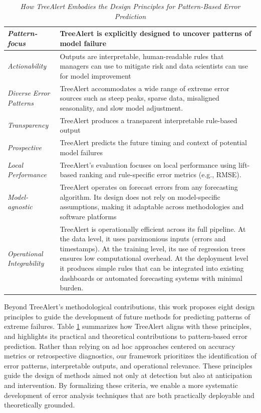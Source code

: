 \documentclass[preprint,12pt]{elsarticle}
\begin{document}
\begin{table}[H]
\centering
\caption{\textit{How TreeAlert Embodies the Design Principles for Pattern-Based Error Prediction}}
\small
\begin{tabular}{|m{2.5cm}|m{12.5cm}|}
\hline
\centering\textit{Pattern-focus} &
TreeAlert is explicitly designed to uncover patterns of model failure \\
\hline
\centering\textit{Actionability} &
Outputs are interpretable, human-readable rules that managers can use to mitigate risk and data scientists can use for model improvement \\
\hline
\centering\textit{Diverse Error Patterns} &
TreeAlert accommodates a wide range of extreme error sources such as steep peaks, sparse data, misaligned seasonality, and slow model adjustment. \\
\hline
\centering\textit{Transparency} &
TreeAlert produces a transparent interpretable rule-based output \\
\hline
\centering\textit{Prospective} &
TreeAlert predicts the future timing and context of potential model failures \\
\hline
\centering\textit{Local Performance} &
TreeAlert’s evaluation focuses on local performance using lift-based ranking and rule-specific error metrics (e.g., RMSE). \\
\hline
\centering\textit{Model-agnostic} &
TreeAlert operates on forecast errors from any forecasting algorithm. Its design does not rely on model-specific assumptions, making it adaptable across methodologies and software platforms \\
\hline
\centering\textit{Operational Integrability} &
TreeAlert is operationally efficient across its full pipeline. At the data level, it uses parsimonious inputs (errors and timestamps). At the training level, its use of regression trees ensures low computational overhead. At the deployment level it produces simple rules that can be integrated into existing dashboards or automated forecasting systems with minimal burden. \\
\hline
\end{tabular}
\label{tab:design}
\end{table}

Beyond TreeAlert's methodological contributions, this work proposes eight design principles to guide the development of future methods for predicting patterns of extreme failures. Table \ref{tab:design} summarizes how TreeAlert aligns with these principles, and highlights its practical and theoretical contributions to pattern-based error prediction. Rather than relying on ad hoc approaches centered on accuracy metrics or retrospective diagnostics, our framework prioritizes the identification of error patterns, interpretable outputs, and operational relevance. These principles guide the design of methods aimed not only at detection but also at anticipation and intervention. By formalizing these criteria, we enable a more systematic development of error analysis techniques that are both practically deployable and theoretically grounded.
\end{document}
